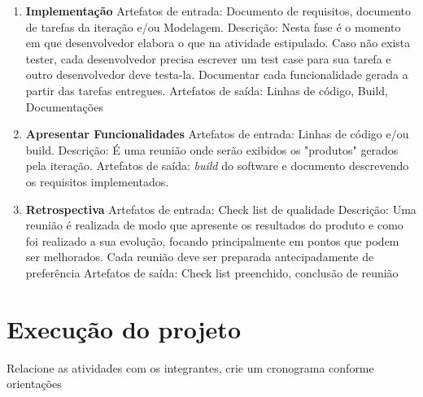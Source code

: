 \documentclass[	DIV=calc,%
							paper=a4,%
							fontsize=12pt,%
							onecolumn]{scrartcl}	 					%
\begin{document}
\begin{enumerate}
	
	\item \textbf{Implementação}
	\subitem Artefatos de entrada: Documento de requisitos, documento de tarefas da iteração  e/ou Modelagem.
	\subitem Descrição: Nesta fase é o momento em que desenvolvedor elabora o que na atividade estipulado. Caso não exista tester, cada desenvolvedor precisa escrever um test case para sua tarefa e outro desenvolvedor deve testa-la. Documentar cada funcionalidade gerada a partir das tarefas entregues.
	\subitem Artefatos de saída: Linhas de código, Build, Documentações 
	
	\item \textbf{Apresentar Funcionalidades} 
	\subitem Artefatos de entrada: Linhas de código e/ou build.
	\subitem Descrição: É uma reunião onde serão exibidos os "produtos" gerados pela iteração. 
	\subitem Artefatos de saída: \textit{build} do software e documento descrevendo os requisitos implementados. 

	\item \textbf{Retrospectiva} 
	\subitem Artefatos de entrada: Check list de qualidade
	\subitem Descrição: Uma reunião é realizada de modo que apresente os resultados do produto e como foi realizado a sua evolução, focando principalmente em pontos que podem ser melhorados. Cada reunião deve ser preparada antecipadamente de preferência
	\subitem Artefatos de saída: Check list preenchido, conclusão de reunião
\end{enumerate}


\section{Execução do projeto}

Relacione as atividades com os integrantes, crie um cronograma conforme orientações
\end{document}
